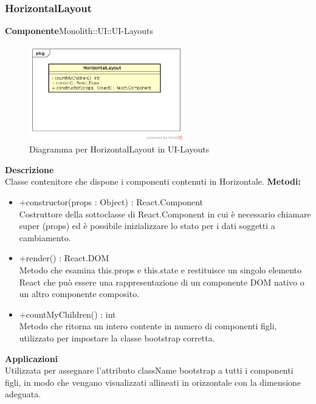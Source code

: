\subsubsection{HorizontalLayout}
\textbf{Componente}Monolith::UI::UI-Layouts\\
   \FloatBarrier
   \begin{figure}[ht]
   \centering
   \includegraphics[width=0.6\textwidth]{img/single-HorizontalLayout}
   \caption{{Diagramma per HorizontalLayout in UI-Layouts}}
\end{figure}
\FloatBarrier
\textbf{Descrizione}\\
Classe contenitore che dispone i componenti contenuti in Horizontale. 
\textbf{Metodi:} \begin{itemize}\item +constructor(props : Object) : React.Component \\Costruttore della sottoclasse di React.Component in cui è necessario chiamare super (props) ed è possibile inizializzare lo stato per i dati soggetti a cambiamento.\item +render() : React.DOM \\Metodo che esamina this.props e this.state e restituisce un singolo elemento React che può essere una rappresentazione di un componente DOM nativo o un altro componente composito.\item +countMyChildren() : int \\Metodo che ritorna un intero contente in numero di componenti figli, utilizzato per impostare la classe bootstrap corretta.\end{itemize} 


\textbf{Applicazioni}\\
Utilizzata per assegnare l'attributo className bootstrap a tutti i componenti figli, in modo che vengano visualizzati allineati in orizzontale con la dimensione adeguata. 


\clearpage

